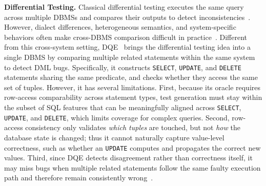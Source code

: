 \textbf{Differential Testing.}
Classical differential testing executes the same query across multiple DBMSs and compares their outputs to detect inconsistencies~\cite{slutz1998massive,bati2007genetic}. 
However, dialect differences, heterogeneous semantics, and system-specific behaviors often make cross-DBMS comparison difficult in practice~\cite{hao2023pinolo}. 
Different from this cross-system setting, \textsc{DQE}~\cite{song2023testing} brings the differential testing idea into a single DBMS by comparing multiple related statements within the same system to detect DML bugs. 
Specifically, it constructs \texttt{SELECT}, \texttt{UPDATE}, and \texttt{DELETE} statements sharing the same predicate, and checks whether they access the same set of tuples. 
However, it has several limitations. 
First, because its oracle requires row-access comparability across statement types, test generation must stay within the subset of SQL features that can be meaningfully aligned across \texttt{SELECT}, \texttt{UPDATE}, and \texttt{DELETE}, which limits coverage for complex queries.   %
Second, row-access consistency only validates \emph{which tuples} are touched, but not \emph{how} the database state is changed; thus it cannot naturally capture value-level correctness, such as whether an \texttt{UPDATE} computes and propagates the correct new values.   %
Third, since \textsc{DQE} detects disagreement rather than correctness itself, it may miss bugs when multiple related statements follow the same faulty execution path and therefore remain consistently wrong~\cite{hao2023pinolo}.  %

